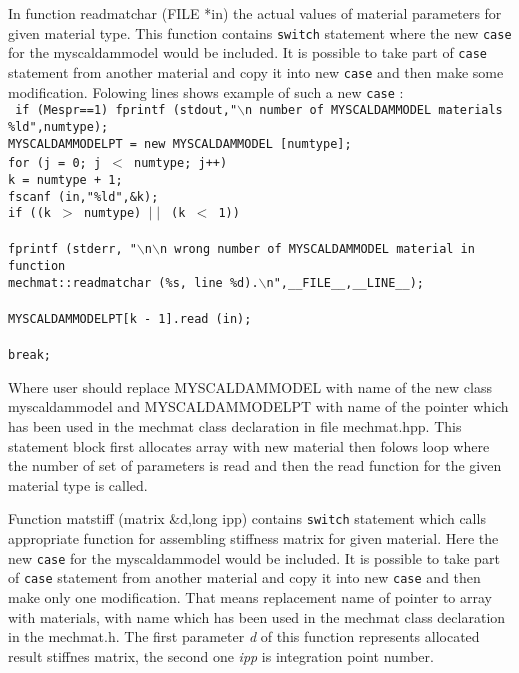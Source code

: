 In function {\sf readmatchar (FILE *in)} the actual values of material parameters for given material type. This function
contains {\tt switch} statement where the new {\tt case} for the  {\sf myscaldammodel} would be included.
It is possible to take part of {\tt case} statement from another material and copy it into new {\tt case} and then
make some modification. Folowing lines shows example of such a new {\tt case} :\\
{\tt
      if (Mespr==1)  fprintf (stdout,"$\backslash$n number of MYSCALDAMMODEL materials \%ld",numtype);\\
      MYSCALDAMMODELPT = new MYSCALDAMMODEL [numtype];\\
      for (j = 0; j $<$ numtype; j++){\\
        k = numtype + 1;\\
        fscanf (in,"\%ld",\&k);\\
        if ((k $>$ numtype) $\mid\mid$ (k $<$ 1))\\
        {\\
          fprintf (stderr, "$\backslash$n$\backslash$n wrong number of MYSCALDAMMODEL material in function\\
                   mechmat::readmatchar (\%s, line \%d).$\backslash$n",\_\_FILE\_\_,\_\_LINE\_\_);\\
        }\\
        MYSCALDAMMODELPT[k - 1].read (in);\\
      }\\
      break;\\
}

Where user should replace MYSCALDAMMODEL with name of the new class {\sf myscaldammodel} and MYSCALDAMMODELPT with
name of the pointer which has been used in the {\sf mechmat} class declaration in file mechmat.hpp. This
statement block first allocates array with new material then folows loop where the number of set of parameters is
read and then the {\sf read} function for the given material type is called.

Function {\sf matstiff (matrix \&d,long ipp)} contains {\tt switch} statement which calls appropriate function
for assembling stiffness matrix for given material. Here the new {\tt case} for the  {\sf myscaldammodel} would be included.
It is possible to take part of {\tt case} statement from another material and copy it into new {\tt case} and then
make only one modification. That means replacement name of pointer to array with materials, with name which has been used
in the {\sf mechmat} class declaration in the mechmat.h. The first parameter {\it d} of this function represents allocated
result stiffnes matrix, the second one {\it ipp} is integration point number.

